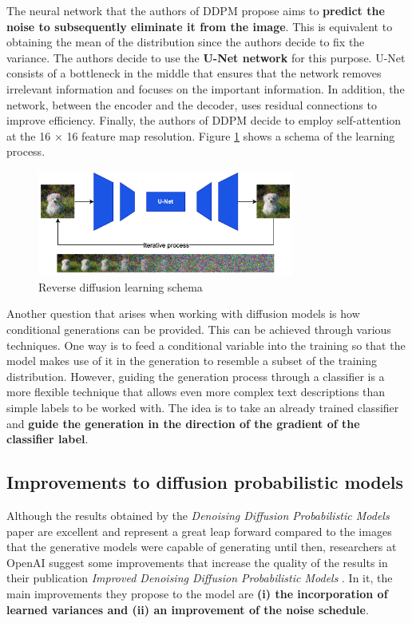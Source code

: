 The neural network that the authors of DDPM propose aims to \textbf{predict the noise to subsequently eliminate it from the image}. This is equivalent to obtaining the mean of the distribution since the authors decide to fix the variance. The authors decide to use the \textbf{U-Net network} \cite{ronneberger2015u} for this purpose. U-Net consists of a bottleneck in the middle that ensures that the network removes irrelevant information and focuses on the important information. In addition, the network, between the encoder and the decoder, uses residual connections to improve efficiency. Finally, the authors of DDPM decide to employ self-attention at the 16 × 16 feature map resolution. Figure \ref{fig:ReverseDP} shows a schema of the learning process.

\begin{figure}
    \centering
    \includegraphics[width=0.75\textwidth]{Pictures/ReverseDP.png} 
    \caption{Reverse diffusion learning schema}
    \label{fig:ReverseDP}
\end{figure}

Another question that arises when working with diffusion models is how conditional generations can be provided. This can be achieved through various techniques. One way is to feed a conditional variable into the training so that the model makes use of it in the generation to resemble a subset of the training distribution. However, guiding the generation process through a classifier is a more flexible technique that allows even more complex text descriptions than simple labels to be worked with. The idea is to take an already trained classifier and \textbf{guide the generation in the direction of the gradient of the classifier label}.

\subsection{Improvements to diffusion probabilistic models }

Although the results obtained by the \textit{Denoising Diffusion Probabilistic Models} \cite{ho2020denoising} paper are excellent and represent a great leap forward compared to the images that the generative models were capable of generating until then, researchers at OpenAI suggest some improvements that increase the quality of the results in their publication \textit{Improved Denoising Diffusion Probabilistic Models} \cite{nichol2021improved}. In it, the main improvements they propose to the model are \textbf{(i) the incorporation of learned variances and (ii) an improvement of the noise schedule}. 

